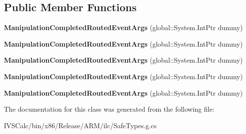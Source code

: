 \subsection*{Public Member Functions}
\begin{DoxyCompactItemize}
\item 
\mbox{\label{class_windows_1_1_u_i_1_1_xaml_1_1_input_1_1_manipulation_completed_routed_event_args_ae735a4d0cb3f4f12d70bedb656be9987}} 
{\bfseries Manipulation\+Completed\+Routed\+Event\+Args} (global\+::\+System.\+Int\+Ptr dummy)
\item 
\mbox{\label{class_windows_1_1_u_i_1_1_xaml_1_1_input_1_1_manipulation_completed_routed_event_args_ae735a4d0cb3f4f12d70bedb656be9987}} 
{\bfseries Manipulation\+Completed\+Routed\+Event\+Args} (global\+::\+System.\+Int\+Ptr dummy)
\item 
\mbox{\label{class_windows_1_1_u_i_1_1_xaml_1_1_input_1_1_manipulation_completed_routed_event_args_ae735a4d0cb3f4f12d70bedb656be9987}} 
{\bfseries Manipulation\+Completed\+Routed\+Event\+Args} (global\+::\+System.\+Int\+Ptr dummy)
\item 
\mbox{\label{class_windows_1_1_u_i_1_1_xaml_1_1_input_1_1_manipulation_completed_routed_event_args_ae735a4d0cb3f4f12d70bedb656be9987}} 
{\bfseries Manipulation\+Completed\+Routed\+Event\+Args} (global\+::\+System.\+Int\+Ptr dummy)
\item 
\mbox{\label{class_windows_1_1_u_i_1_1_xaml_1_1_input_1_1_manipulation_completed_routed_event_args_ae735a4d0cb3f4f12d70bedb656be9987}} 
{\bfseries Manipulation\+Completed\+Routed\+Event\+Args} (global\+::\+System.\+Int\+Ptr dummy)
\end{DoxyCompactItemize}


The documentation for this class was generated from the following file\+:\begin{DoxyCompactItemize}
\item 
I\+V\+S\+Calc/bin/x86/\+Release/\+A\+R\+M/ilc/Safe\+Types.\+g.\+cs\end{DoxyCompactItemize}
